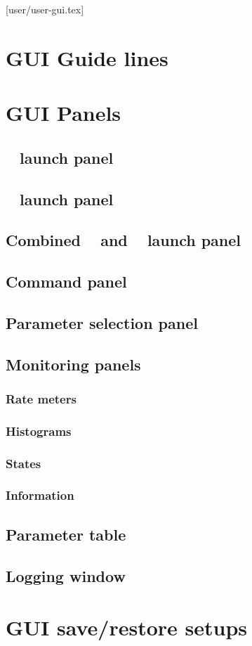 [user/user-gui.tex]
\section{GUI Guide lines}
\section{GUI Panels}
\subsection{\dabc~ launch panel}
\subsection{\mbs~ launch panel}
\subsection{Combined \dabc~ and \mbs~ launch panel}
\subsection{Command panel}
\subsection{Parameter selection panel}
\subsection{Monitoring panels}
\subsubsection{Rate meters}
\subsubsection{Histograms}
\subsubsection{States}
\subsubsection{Information}
\subsection{Parameter table}
\subsection{Logging window}
\section{GUI save/restore setups}

